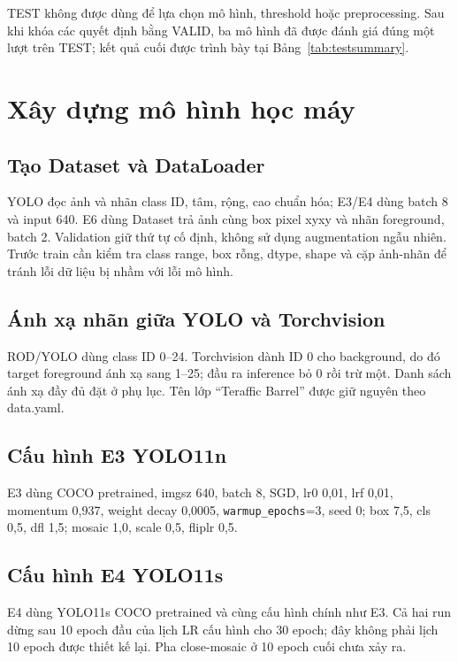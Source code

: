 \documentclass[12pt,a4paper,oneside]{report}
\begin{document}
TEST không được dùng để lựa chọn mô hình, threshold hoặc preprocessing. Sau khi khóa các quyết định bằng VALID, ba mô hình đã được đánh giá đúng một lượt trên TEST; kết quả cuối được trình bày tại Bảng~\ref{tab:testsummary}.
\section{Xây dựng mô hình học máy}
\subsection{Tạo Dataset và DataLoader}
YOLO đọc ảnh và nhãn class ID, tâm, rộng, cao chuẩn hóa; E3/E4 dùng batch 8 và input 640. E6 dùng Dataset trả ảnh cùng box pixel xyxy và nhãn foreground, batch 2. Validation giữ thứ tự cố định, không sử dụng augmentation ngẫu nhiên. Trước train cần kiểm tra class range, box rỗng, dtype, shape và cặp ảnh-nhãn để tránh lỗi dữ liệu bị nhầm với lỗi mô hình.
\subsection{Ánh xạ nhãn giữa YOLO và Torchvision}
ROD/YOLO dùng class ID 0--24. Torchvision dành ID 0 cho background, do đó target foreground ánh xạ sang 1--25; đầu ra inference bỏ 0 rồi trừ một. Danh sách ánh xạ đầy đủ đặt ở phụ lục. Tên lớp “Teraffic Barrel” được giữ nguyên theo data.yaml.
\subsection{Cấu hình E3 YOLO11n}
E3 dùng COCO pretrained, imgsz 640, batch 8, SGD, lr0 0,01, lrf 0,01, momentum 0,937, weight decay 0,0005, \texttt{warmup\_epochs}=3, seed 0; box 7,5, cls 0,5, dfl 1,5; mosaic 1,0, scale 0,5, fliplr 0,5.
\subsection{Cấu hình E4 YOLO11s}
E4 dùng YOLO11s COCO pretrained và cùng cấu hình chính như E3. Cả hai run dừng sau 10 epoch đầu của lịch LR cấu hình cho 30 epoch; đây không phải lịch 10 epoch được thiết kế lại. Pha close-mosaic ở 10 epoch cuối chưa xảy ra.
\end{document}
